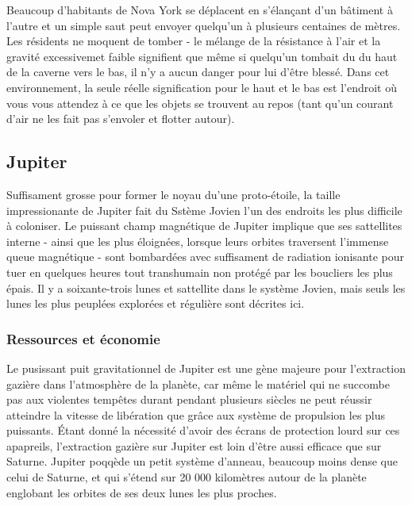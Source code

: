                                                                Beaucoup d'habitants de Nova York se déplacent en s'élançant d'un bâtiment à l'autre et un simple saut peut envoyer quelqu'un à plusieurs centaines de mètres. Les résidents ne moquent de tomber - le mélange de la résistance à l'air et la gravité excessivemet faible signifient que même si quelqu'un tombait du du haut de la caverne vers le bas, il n'y a aucun danger pour lui d'être blessé. Dans cet environnement, la seule réelle signification pour le haut et le bas est l'endroit où vous vous attendez à ce que les objets se trouvent au repos (tant qu'un courant d'air ne les fait pas s'envoler et flotter autour). 

                                                               \subsection{Jupiter} \label{sec:jupiter} 

                                                               Suffisament grosse pour former le noyau du'une proto-étoile, la taille impressionante de Jupiter fait du Sstème Jovien l'un des endroits les plus difficile à coloniser. Le puissant champ magnétique de Jupiter implique que ses sattellites interne - ainsi que les plus éloignées, lorsque leurs orbites traversent l'immense queue magnétique - sont bombardées avec suffisament de radiation ionisante pour tuer en quelques heures tout transhumain non protégé par les boucliers les plus épais. Il y a soixante-trois lunes et sattellite dans le système Jovien, mais seuls les lunes les plus peuplées explorées et régulière sont décrites ici. 

                                                               \subsubsection{Ressources et économie} \label{sec:jupiter-resources-economy} 

                                                               Le pusissant puit gravitationnel de Jupiter est une gène majeure pour l'extraction gazière dans l'atmosphère de la planète, car même le matériel qui ne succombe pas aux violentes tempêtes durant pendant plusieurs siècles ne peut réussir atteindre la vitesse de libération que grâce aux système de propulsion les plus puissants. Étant donné la nécessité d'avoir des écrans de protection lourd sur ces apapreils, l'extraction gazière sur Jupiter est loin d'être aussi efficace que sur Saturne. Jupiter poqqède un petit système d'anneau, beaucoup moins dense que celui de Saturne, et qui s'étend sur 20 000 kilomètres autour de la planète englobant les orbites de ses deux lunes les plus proches. 

